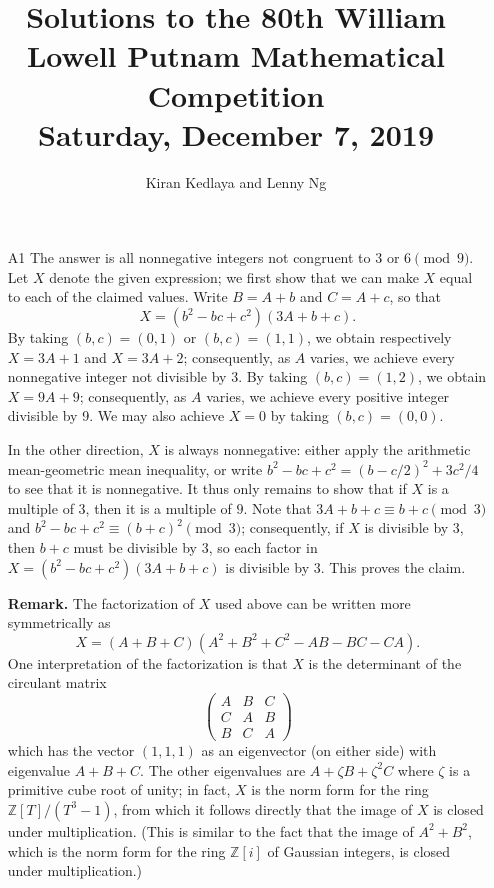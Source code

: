 \documentclass[amssymb,twocolumn,pra,10pt,aps]{revtex4-1}
\newcommand{\ZZ}{\mathbb{Z}}
\begin{document}
\title{Solutions to the 80th William Lowell Putnam Mathematical Competition \\
    Saturday, December 7, 2019}
\author{Kiran Kedlaya and Lenny Ng}
\noaffiliation
\maketitle

\begin{itemize}
\item[A1]
The answer is all nonnegative integers not congruent to $3$ or $6 \pmod{9}$. Let $X$ denote the given expression;
we first show that we can make $X$ equal to each of the claimed values. Write $B=A+b$ and $C=A+c$, so that
\[
X = (b^2-bc+c^2)(3A+b+c).
\]
By taking $(b,c) = (0,1)$ or $(b,c) = (1,1)$, we obtain respectively $X = 3A+1$ and $X = 3A+2$; consequently, as $A$ varies, we achieve every nonnegative integer not divisible by 3. By taking $(b,c) = (1,2)$, we obtain $X = 9A+9$; consequently, as $A$ varies, we achieve every positive integer divisible by 9. We may also achieve $X=0$
by taking $(b,c) = (0,0)$.

In the other direction, $X$ is always nonnegative: either apply the arithmetic mean-geometric mean inequality, or write $b^2-bc+c^2 = (b - c/2)^2 + 3c^2/4$ to see that it is nonnegative.
It thus only remains to show that if $X$ is a multiple of $3$, then it is a multiple of $9$. Note that
$3A+b+c \equiv b+c \pmod{3}$ and $b^2-bc+c^2 \equiv (b+c)^2 \pmod{3}$; consequently, if $X$ is divisible by $3$,
then $b+c$ must be divisible by $3$, so each factor in $X = (b^2-bc+c^2)(3A+b+c)$ is divisible by $3$.
This proves the claim.

\noindent
\textbf{Remark.}
The factorization of $X$ used above can be written more symmetrically as
\[
X = (A+B+C)(A^2+B^2+C^2-AB-BC-CA).
\]
One interpretation of the factorization is that $X$ is the determinant of the circulant matrix
\[
\begin{pmatrix}
A & B & C \\
C & A & B \\
B & C & A
\end{pmatrix}
\]
which has the vector $(1,1,1)$ as an eigenvector (on either side) with eigenvalue $A+B+C$. The other eigenvalues are $A + \zeta B + \zeta^2 C$ where $\zeta$ is a primitive cube root of unity; in fact, $X$ is the norm form for the ring $\ZZ[T]/(T^3 - 1)$, from which it follows directly that the image of $X$ is closed under multiplication. (This is similar to the fact that the image of $A^2+B^2$, which is the norm form for the ring $\mathbb{Z}[i]$ of Gaussian integers, is closed under multiplication.)


\end{itemize}
\end{document}
